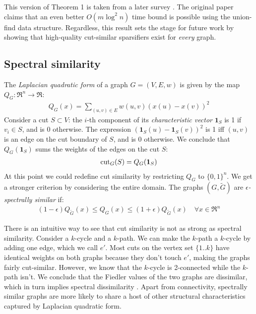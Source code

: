 \documentclass{article}
\begin{document}
This version of Theorem 1 is taken from a later survey \cite{TheSurvey}. The
original paper claims that an even better $O(m\log^2 n)$ time bound is
possible using the union-find data structure. Regardless, this result sets
the stage for future work by showing that high-quality cut-similar
sparsifiers exist for \textit{every} graph. 

\subsection{Spectral similarity}

The \textit{Laplacian quadratic form} of a graph $G = (V, E, w)$ is given by
the map $Q_G : \Re^n \rightarrow \Re$:
\begin{align*}
    Q_G(x) = \sum_{(u, v) \in E} w(u, v)(x(u) - x(v))^2
\end{align*}
Consider a cut $S \subset V$: the $i$-th component of its
\textit{characteristic vector} $\mathbf{1}_S$ is 1 if $v_i \in S$, and is 0
otherwise. The expression $(\mathbf{1}_S(u) - \mathbf{1}_S(v))^2$ is 1 iff
$(u, v)$ is an edge on the cut boundary of $S$, and is 0 otherwise. We
conclude that $Q_G(\mathbf{1}_S)$ sums the weights of the edges on the cut
$S$:
\begin{align*}
    \text{cut}_{G}(S) = Q_G(\mathbf{1}_S)
\end{align*}
At this point we could redefine cut similarity by restricting $Q_G$ to $\{0,
1\}^n$. We get a stronger criterion by considering the entire domain.  The
graphs $(G, \tilde{G})$ are \textit{$\epsilon$-spectrally similar} if:
\begin{align*}
    (1 - \epsilon)Q_{\tilde{G}}(x) \leq Q_G(x) \leq (1 +
    \epsilon)Q_{\tilde{G}}(x) \quad \forall{x \in \Re^n}
\end{align*}

There is an intuitive way to see that cut similarity is not as strong as
spectral similarity. Consider a $k$-cycle and a $k$-path. We can make the
$k$-path a $k$-cycle by adding one edge, which we call $e'$. Most cuts on
the vertex set $\{1..k\}$ have identical weights on both graphs because they
don't touch $e'$, making the graphs fairly cut-similar. However, we know
that the $k$-cycle is 2-connected while the $k$-path isn't. We conclude that
the Fiedler values of the two graphs are dissimilar, which in turn implies
spectral dissimilarity \cite{Fiedler}. Apart from connectivity, spectrally
similar graphs are more likely to share a host of other structural
characteristics captured by Laplacian quadratic form.
\end{document}

